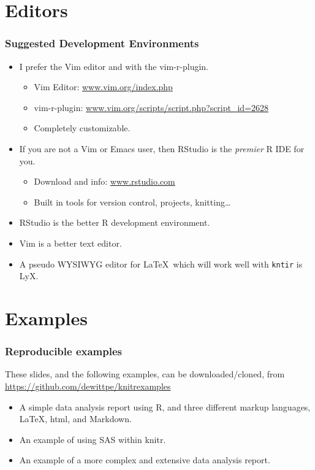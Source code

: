 \documentclass[t]{beamer}\usepackage[]{graphicx}\usepackage[]{color}
\begin{document}
\section{Editors} 
\begin{frame}
  \frametitle{Suggested Development Environments}

  \begin{itemize}
    \item I prefer the Vim editor and with the vim-r-plugin.  
      \begin{itemize}
        \item Vim Editor: \url{www.vim.org/index.php}
        \item vim-r-plugin: \url{www.vim.org/scripts/script.php?script\_id=2628} 
        \item Completely customizable.
      \end{itemize}

    \item If you are not a Vim or Emacs user, then RStudio is the \emph{premier}
      R IDE for you.
      \begin{itemize}
        \item Download and info: \url{www.rstudio.com}

        \item Built in tools for version control, projects, knitting\ldots
      \end{itemize}


    \item RStudio is the better R development environment.  
    \item Vim is a better text editor.

    \item A pseudo WYSIWYG editor for \LaTeX\ which will work well with 
      {\tt kntir} is LyX.
      
  \end{itemize}
\end{frame}

\section{Examples}
\begin{frame}
  \frametitle{Reproducible examples}
  These slides, and the following examples, can be downloaded/cloned, from
  \url{https://github.com/dewittpe/knitrexamples}

  \begin{itemize}
    \item A simple data analysis report using R, and three different markup
      languages, \LaTeX, html, and Markdown.
    \item An example of using SAS within knitr.
    \item An example of a more complex and extensive data analysis report.
  \end{itemize}
\end{frame}
\end{document}
